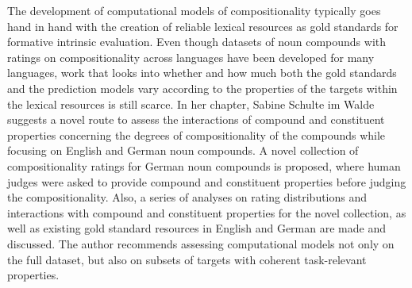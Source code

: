 \begin{refsection}
The development of computational models of compositionality typically goes hand in hand with the creation of reliable lexical resources as gold standards for formative intrinsic evaluation. Even though datasets of noun compounds with ratings on compositionality across languages have been developed for many languages, work that looks into whether and how much both the gold standards and the prediction models vary according to the properties of the targets within the lexical resources is still scarce. 
In her chapter, Sabine Schulte im Walde suggests a novel route to assess the interactions of compound and constituent properties concerning the degrees of compositionality of the compounds  while focusing on English and German noun compounds. %
A novel collection of compositionality ratings for 
German noun compounds is proposed, where human judges were asked to provide compound and constituent properties 
before judging the compositionality.
Also, a series of analyses on rating distributions and interactions with compound and constituent properties for the novel collection, as well as existing gold standard resources in English and German are made and discussed. The author recommends assessing computational models not only on the full dataset, but also on subsets of targets with coherent task-relevant properties.


\end{refsection}
